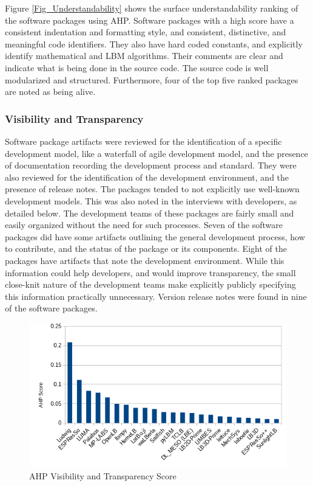 \documentclass[12pt, notitlepage]{article}
\begin{document}
Figure \ref{Fig_Understandability} shows the surface understandability ranking of the software packages using AHP. Software packages with a high score have a consistent indentation and formatting style, and consistent, distinctive, and meaningful code identifiers. They also have hard coded constants, and explicitly identify mathematical and LBM algorithms. Their comments are clear and indicate what is being done in the source code. The source code is well modularized and structured. Furthermore, four of the top five ranked packages are noted as being alive.

\subsubsection{Visibility and Transparency}

Software package artifacts were reviewed for the identification of a specific development model, like a waterfall of agile development model, and the presence of documentation recording the development process and standard. They were also reviewed for the identification of the development environment, and the presence of release notes. The packages tended to not explicitly use well-known development models. This was also noted in the interviews with developers, as detailed below. The development teams of these packages are fairly small and easily organized without the need for such processes. Seven of the software packages did have some artifacts outlining the general development process, how to contribute, and the status of the package or its components. Eight of the packages have artifacts that note the development environment. While this information could help developers, and would improve transparency, the small close-knit nature of the development teams make explicitly publicly specifying this information practically unnecessary. Version release notes were found in nine of the software packages.

\begin{figure}[h!]
	\begin{center}
		\includegraphics[width=1.0\textwidth]{visibilitytransparency_chart}
		\caption{AHP Visibility and Transparency Score}
		\label{Fig_VisibilityTransparency}
	\end{center}
\end{figure}
\end{document}
